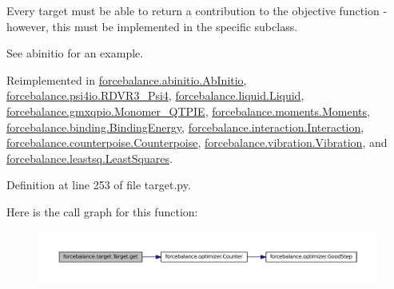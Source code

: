 \-Every target must be able to return a contribution to the objective function -\/ however, this must be implemented in the specific subclass. 

\-See abinitio for an example. 

\-Reimplemented in \hyperlink{classforcebalance_1_1abinitio_1_1AbInitio_a2bb3ed7209707f688ec8b731392466b5}{forcebalance.\-abinitio.\-Ab\-Initio}, \hyperlink{classforcebalance_1_1psi4io_1_1RDVR3__Psi4_a70936cb704ab5df307013cc6aa5b85c8}{forcebalance.\-psi4io.\-R\-D\-V\-R3\-\_\-\-Psi4}, \hyperlink{classforcebalance_1_1liquid_1_1Liquid_a802c4139e5c002fabdeab5de88093880}{forcebalance.\-liquid.\-Liquid}, \hyperlink{classforcebalance_1_1gmxqpio_1_1Monomer__QTPIE_a46144411b5166a1839bf954b584ca3a7}{forcebalance.\-gmxqpio.\-Monomer\-\_\-\-Q\-T\-P\-I\-E}, \hyperlink{classforcebalance_1_1moments_1_1Moments_a488308fb94a59f876efecb115b2e60b3}{forcebalance.\-moments.\-Moments}, \hyperlink{classforcebalance_1_1binding_1_1BindingEnergy_a263fadef13141ef341a01d1f538f85af}{forcebalance.\-binding.\-Binding\-Energy}, \hyperlink{classforcebalance_1_1interaction_1_1Interaction_a9fc3a40eb2852241ea440af719f6cf29}{forcebalance.\-interaction.\-Interaction}, \hyperlink{classforcebalance_1_1counterpoise_1_1Counterpoise_a5fd50a4bb7d5e939b7e99ac648b35d59}{forcebalance.\-counterpoise.\-Counterpoise}, \hyperlink{classforcebalance_1_1vibration_1_1Vibration_a3b20f6a97f3aba4f704056ed12a999a5}{forcebalance.\-vibration.\-Vibration}, and \hyperlink{classforcebalance_1_1leastsq_1_1LeastSquares_a2010f34730d88209b738d557cca09a1c}{forcebalance.\-leastsq.\-Least\-Squares}.



\-Definition at line 253 of file target.\-py.



\-Here is the call graph for this function\-:
\nopagebreak
\begin{figure}[H]
\begin{center}
\leavevmode
\includegraphics[width=350pt]{classforcebalance_1_1target_1_1Target_a1389888302c49d529716cb45b13a6f5a_cgraph}
\end{center}
\end{figure}


